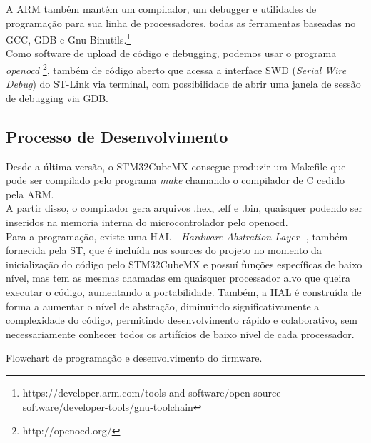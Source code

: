 \documentclass[11pt,a4paper]{report}
\begin{document}
	A ARM também mantém um compilador, um debugger e utilidades de programação para sua linha de processadores, todas as ferramentas baseadas no GCC, GDB e Gnu Binutils.\footnote{https://developer.arm.com/tools-and-software/open-source-software/developer-tools/gnu-toolchain}\\
	
	Como software de upload de código e debugging, podemos usar o programa {\it openocd} \footnote{http://openocd.org/}, também de código aberto que acessa a interface SWD ({\it Serial Wire Debug}) do ST-Link via terminal, com possibilidade de abrir uma janela de sessão de debugging via GDB.
	
	\subsection{Processo de Desenvolvimento}
	Desde a última versão, o STM32CubeMX consegue produzir um Makefile que pode ser compilado pelo programa {\it make} chamando o compilador de C cedido pela ARM.\\
	
	A partir disso, o compilador gera arquivos .hex, .elf e .bin, quaisquer podendo ser inseridos na memoria interna do microcontrolador pelo openocd.\\
	
	Para a programação, existe uma HAL - {\it Hardware Abstration Layer} -, também fornecida pela ST, que é incluída nos sources do projeto no momento da inicialização do código pelo STM32CubeMX e possuí funções específicas de baixo nível, mas tem as mesmas chamadas em quaisquer processador alvo que queira executar o código, aumentando a portabilidade. Também, a HAL é construída de forma a aumentar o nível de abstração, diminuindo significativamente a complexidade do código, permitindo desenvolvimento rápido e colaborativo, sem necessariamente conhecer todos os artifícios de baixo nível de cada processador.
	\begin{center}
		\vspace{0.1cm}
	\footnotesize{Flowchart de programação e desenvolvimento do firmware.}
	\end{center}
\end{document}
